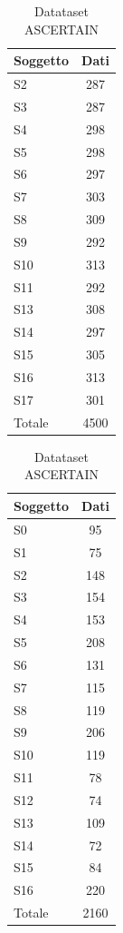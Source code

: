 \begin{table}[h]
    \parbox{.45\linewidth}{
    	\begin{center}
    		\begin{tabular}{l|c}
    		     \textbf{Soggetto} & \textbf{Dati}\\
    		     \hline
    		     S2 & 287 \\
    		     S3 & 287 \\
    		     S4 & 298 \\
    		     S5 & 298 \\
    		     S6 & 297 \\
    		     S7 & 303 \\
    		     S8 & 309 \\
    		     S9 & 292 \\
    		     S10 & 313 \\
    		     S11 & 292 \\
    		     S13 & 308 \\
    		     S14 & 297 \\
    		     S15 & 305 \\
    		     S16 & 313 \\
    		     S17 & 301 \\
    		     \hline
    		     Totale & 4500
    		\end{tabular}
    		\caption{Datataset WESAD}
    		\label{tab:splittedwesad}
    	\end{center}
	}
    \parbox{.45\linewidth}{
    	\begin{center}
    		\begin{tabular}{l|c}
    		     \textbf{Soggetto} & \textbf{Dati}\\
    		     \hline
    		     S0 & 95 \\
    		     S1 & 75 \\
    		     S2 & 148 \\
    		     S3 & 154 \\
    		     S4 & 153 \\
    		     S5 & 208 \\
    		     S6 & 131 \\
    		     S7 & 115 \\
    		     S8 & 119 \\
    		     S9 & 206 \\
    		     S10 & 119 \\
    		     S11 & 78 \\
    		     S12 & 74 \\
    		     S13 & 109 \\
    		     S14 & 72 \\
    		     S15 & 84 \\
    		     S16 & 220 \\
    		     \hline
    		     Totale & 2160
    		\end{tabular}
    		\caption{Datataset ASCERTAIN}
    		\label{tab:splittedascertain}
    	\end{center}
    }
\end{table}
